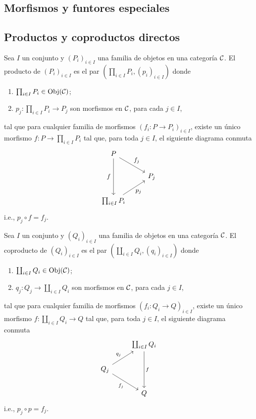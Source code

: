 
\subsection{Morfismos y funtores especiales}

\subsection{Productos y coproductos directos}

\begin{definicion}
\label{def:propiedad universal del producto}
    Sea $I$ un conjunto y $(P_i)_{i\in I}$ una familia de objetos en una categoría $\mathcal{C}$. El producto de $(P_i)_{i\in I}$ es el par $(\prod_{i\in I}P_i,(p_i)_{i\in I})$ donde 
    \begin{enumerate}[label=(\arabic*)]
        \item $\prod_{i\in I}P_i\in\mathrm{Obj}(\mathcal{C})$;
        \item $p_j:\prod_{i\in I}P_i\to P_j$ son morfismos en $\mathcal{C}$, para cada $j\in I$,
    \end{enumerate}
    tal que para cualquier familia de morfismos $(f_i:P\to P_i)_{i\in I}$, existe un único morfismo $f:P\to\prod_{i\in I}P_i$ tal que, para toda $j\in I$, el siguiente diagrama conmuta
    \[
\begin{tikzcd}[every label/.append style = {font = \small}]
   P \arrow[dd,"f"'{xshift=-1.75pt}]  \arrow[dr,"f_j"] \\
   & P_j  \\
   \prod_{i\in I}P_i  \arrow[ur,"p_j"']
\end{tikzcd}
\] 
i.e., $p_j\circ f=f_j$.
\end{definicion}
\begin{definicion}
\label{def:propiedad universal del coproducto}
    Sea $I$ un conjunto y $(Q_i)_{i\in I}$ una familia de objetos en una categoría $\mathcal{C}$. El coproducto de $(Q_i)_{i\in I}$ es el par $(\coprod_{i\in I}Q_i,(q_i)_{i\in I})$ donde 
    \begin{enumerate}[label=(\arabic*)]
        \item $\coprod_{i\in I}Q_i\in\mathrm{Obj}(\mathcal{C})$;
        \item $q_j:Q_j\to\coprod_{i\in I}Q_i$ son morfismos en $\mathcal{C}$, para cada $j\in I$,
    \end{enumerate}
    tal que para cualquier familia de morfismos $(f_i:Q_i\to Q)_{i\in I}$, existe un único morfismo $f:\coprod_{i\in I}Q_i\to Q$ tal que, para toda $j\in I$, el siguiente diagrama conmuta
    \[
\begin{tikzcd}[]
 &
  \coprod_{i\in I}Q_i \arrow[dd,"f"] \\
  Q_j\arrow[ur,"q_j"] \arrow[dr,"f_j"'] & \\
  & Q
\end{tikzcd}
\]    
i.e., $p_j\circ p=f_j$.
\end{definicion}
